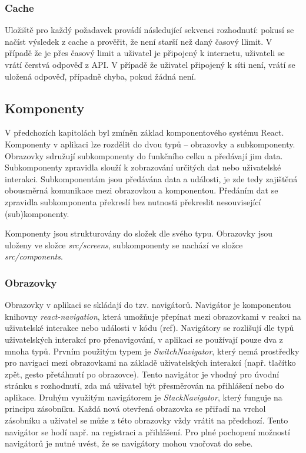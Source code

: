 \subsubsection{Cache}


Uložiště pro každý požadavek provádí následující sekvenci rozhodnutí: pokusí se načíst výsledek z cache a prověřit, že není starší než daný časový llimit. V případě že je přes časový limit a uživatel je připojený k internetu, uživateli se vrátí čerstvá odpověď z API. V případě že uživatel připojený k síti není, vrátí se uložená odpověď, případně chyba, pokud žádná není.

\subsection{Komponenty}

V předchozích kapitolách byl zmíněn základ komponentového systému React. Komponenty v aplikaci lze rozdělit do dvou typů -- obrazovky a subkomponenty. Obrazovky sdružují subkomponenty do funkčního celku a předávají jim data. Subkomponenty zpravidla slouží k zobrazování určitých dat nebo uživatelské interakci. Subkomponentám jsou předávána data a události, je zde tedy zajištěná obousměrná komunikace mezi obrazovkou a komponentou. Předáním dat se zpravidla subkomponenta překreslí bez nutnosti překreslit nesouvisející (sub)komponenty.

Komponenty jsou strukturovány do složek dle svého typu. Obrazovky jsou uloženy ve složce \emph{src/screens}, subkomponenty se nachází ve složce \emph{src/components}.

\subsubsection{Obrazovky}

Obrazovky v aplikaci se skládají do tzv. navigátorů. Navigátor je komponentou knihovny \emph{react-navigation}, která umožňuje přepínat mezi obrazovkami v reakci na uživatelské interakce nebo události v kódu (ref). Navigátory se rozlišují dle typů uživatelských interakcí pro přenavigování, v aplikaci se používají pouze dva z mnoha typů. Prvním použitým typem je \emph{SwitchNavigator}, který nemá prostředky pro navigaci mezi obrazovkami na základě uživatelských interakcí (např. tlačítko zpět, gesto přetáhnutí po obrazovce). Tento navigátor je vhodný pro úvodní stránku s rozhodnutí, zda má uživatel být přesměrován na přihlášení nebo do aplikace. Druhým využitým navigátorem je \emph{StackNavigator}, který funguje na principu zásobníku. Každá nová otevřená obrazovka se přiřadí na vrchol zásobníku a uživatel se může z této obrazovky vždy vrátit na předchozí. Tento navigátor se hodí např. na registraci a přihlášení. Pro plné pochopení možností navigátorů je nutné uvést, že se navigátory mohou vnořovat do sebe.

